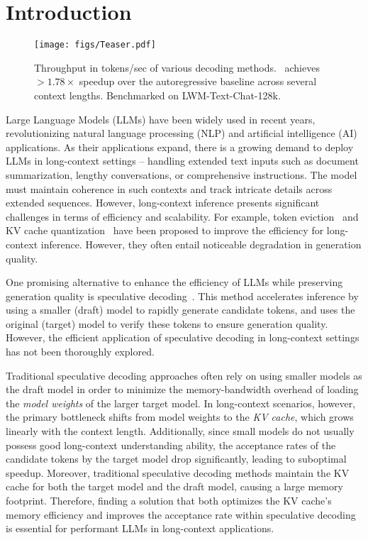 

\section{Introduction}
\begin{figure}[t]
    \centering
    \texttt{[image: figs/Teaser.pdf]}
    \caption{Throughput in tokens/sec of various decoding methods. \OURS\ achieves $>1.78\times$ speedup over the autoregressive baseline across several context lengths. Benchmarked on LWM-Text-Chat-128k.}
    \label{fig:placeholder}
    \vspace{-0.2cm}
\end{figure}


Large Language Models (LLMs) have been widely used in recent years, revolutionizing natural language processing (NLP) and artificial intelligence (AI) applications. 
As their applications expand, there is a growing demand to deploy LLMs in long-context settings -- handling extended text inputs such as document summarization, lengthy conversations, or comprehensive instructions. 
The model must maintain coherence in such contexts and track intricate details across extended sequences. 
However, long-context inference presents significant challenges in terms of efficiency and scalability.
For example, token eviction~\cite{zhang2024h2o,ge2023model,liu2024scissorhands} and KV cache quantization~\cite{liu2024kivi,kang2024gear,hooper2024kvquant} have been proposed to improve the efficiency for long-context inference. However, they often entail noticeable degradation in generation quality.


One promising alternative to enhance the efficiency of LLMs while preserving generation quality is speculative decoding~\cite{leviathan2023fast,chen2023accelerating,kim2024speculative}. 
This method accelerates inference by using a smaller (draft) model to rapidly generate candidate tokens, and uses the original (target) model to verify these tokens to ensure generation quality. However, the efficient application of speculative decoding in long-context settings has not been thoroughly explored.

Traditional speculative decoding approaches often rely on using smaller models as the draft model in order to minimize the memory-bandwidth overhead of loading the \textit{model weights} of the larger target model.
In long-context scenarios, however, the primary bottleneck shifts from model weights to the \textit{KV cache}, which grows linearly with the context length. Additionally, since small models do not usually possess good long-context understanding ability, the acceptance rates of the candidate tokens by the target model drop significantly, leading to suboptimal speedup.
Moreover, traditional speculative decoding methods maintain the KV cache for both the target model and the draft model, causing a large memory footprint. Therefore, finding a solution that both optimizes the KV cache's memory efficiency and improves the acceptance rate within speculative decoding is essential for performant LLMs in long-context applications.


